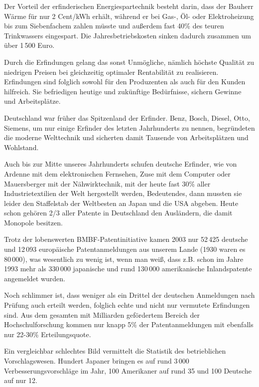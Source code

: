 \documentclass[11pt,a4paper]{article}
\begin{document}
Der Vorteil der erfinderischen Energiespartechnik besteht darin, dass der
Bauherr Wärme für nur 2 Cent/kWh erhält, während er bei Gas-, Öl- oder
Elektroheizung bis zum Siebenfachem zahlen müsste und außerdem fast 40\% des
teuren Trinkwassers eingespart. Die Jahresbetriebskosten sinken dadurch
zusammen um über 1\,500 Euro.

Durch die Erfindungen gelang das sonst Unmögliche, nämlich höchste Qualität zu
niedrigen Preisen bei gleichzeitig optimaler Rentabilität zu realisieren.
Erfindungen sind folglich sowohl für den Produzenten als auch für den Kunden
hilfreich. Sie befriedigen heutige und zukünftige Bedürfnisse, sichern Gewinne
und Arbeitsplätze.

Deutschland war früher das Spitzenland der Erfinder.  Benz, Bosch, Diesel,
Otto, Siemens, um nur einige Erfinder des letzten Jahrhunderts zu nennen,
begründeten die moderne Welttechnik und sicherten damit Tausende von
Arbeitsplätzen und Wohlstand.

Auch bis zur Mitte unseres Jahrhunderts schufen deutsche Erfinder, wie von
Ardenne mit dem elektronischen Fernsehen, Zuse mit dem Computer oder
Mauersberger mit der Nähwirktech\-nik, mit der heute fast 30\% aller
Industrietextilien der Welt hergestellt werden, Bedeutendes, dann mussten sie
leider den Staffelstab der Weltbesten an Japan und die USA abgeben. Heute
schon gehören 2/3 aller Patente in Deutschland den Ausländern, die damit
Monopole besitzen.

Trotz der lobenswerten BMBF-Patentinitiative kamen 2003 nur 52\,425 deutsche
und 12\,093 europäische Patentanmeldungen aus unserem Lande (1930 waren es
80\,000), was wesentlich zu wenig ist, wenn man weiß, dass z.B. schon im Jahre
1993 mehr als 330\,000 japanische und rund 130\,000 amerikanische
Inlandspatente angemeldet wurden.

Noch schlimmer ist, dass weniger als ein Drittel der deutschen Anmeldungen
nach Prüfung auch erteilt werden, folglich echte und nicht nur vermutete
Erfindungen sind. Aus dem gesamten mit Milliarden gefördertem Bereich der
Hochschulforschung kommen nur knapp 5\% der Patentanmeldungen mit ebenfalls
nur 22-30\% Erteilungsquote.

Ein vergleichbar schlechtes Bild vermittelt die Statistik des betrieblichen
Vorschlagswesen.  Hundert Japaner bringen es auf rund 3\,000
Verbesserungsvorschläge im Jahr, 100 Amerikaner auf rund 35 und 100 Deutsche
auf nur 12.
\end{document}
